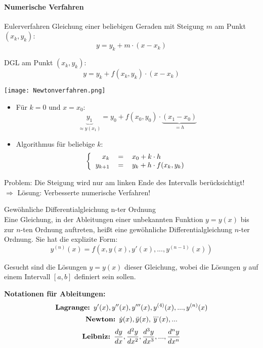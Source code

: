 \paragraph{Numerische Verfahren}
\begin{definition}{Eulerverfahren}
  Gleichung einer beliebigen Geraden mit Steigung \(m\) am Punkt \((x_k,y_k)\):
      \[y=y_k+m\cdot(x-x_k)\]
    \begin{minipage}{0.5\linewidth}
      DGL am Punkt \((x_k,y_k)\):
      \[y=y_k+f(x_k,y_k)\cdot (x-x_k)\]
    \end{minipage}
    \begin{minipage}{0.45\linewidth}
      \begin{center}
        \texttt{[image: Newtonverfahren.png]}
        \end{center}
    \end{minipage}
  \begin{itemize}

    \item Für \(k=0 \text{ und } x=x_0\):
      \[\underbrace{y_1}_{\approx y(x_1)}=y_0+f(x_0,y_0)\cdot\underbrace{(x_1-x_0)}_{=h}\]
    \item Algorithmus für beliebige \(k\):
      \[\left\{\begin{tabular}{rcl}
	  \(x_k\)&\(=\)&\(x_0+k\cdot h\)\\
	  \(y_{k+1}\)&\(=\)&\(y_k+h\cdot f(x_k,y_k)\)
	\end{tabular}
      \right.\]
  \end{itemize}
  Problem: Die Steigung wird nur am linken Ende des Intervalls berücksichtigt!
    \\ $\Rightarrow$ Lösung: Verbesserte numerische Verfahren!
\end{definition}


\begin{definition}{Gewöhnliche Differentialgleichung n-ter Ordnung}\\
Eine Gleichung, in der Ableitungen einer unbekannten Funktion $y = y(x)$ bis zur $n$-ten Ordnung auftreten, heißt eine gewöhnliche Differentialgleichung $n$-ter Ordnung. Sie hat die explizite Form:
$$y^{(n)}(x) = f\left(x, y(x), y'(x), ..., y^{(n-1)}(x)\right)$$

Gesucht sind die Lösungen $y = y(x)$ dieser Gleichung, wobei die Lösungen $y$ auf einem Intervall $[a,b]$ definiert sein sollen.

\textbf{Notationen für Ableitungen:}
$$\text{\textbf{Lagrange: }} y'(x), y''(x), y'''(x), y^{(4)}(x), ..., y^{(n)}(x)$$
$$\text{\textbf{Newton: }} \dot{y}(x), \ddot{y}(x), \dddot{y}(x), ...$$
$$\text{\textbf{Leibniz: }} \frac{dy}{dx}, \frac{d^2y}{dx^2}, \frac{d^3y}{dx^3}, ..., \frac{d^ny}{dx^n}$$
\end{definition}

